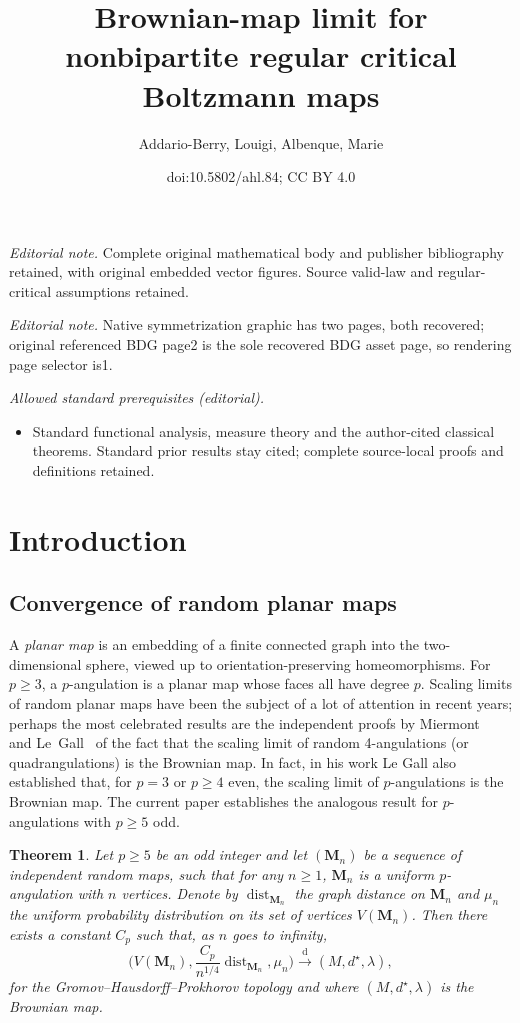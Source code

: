\documentclass[10pt]{amsart}
\title{Brownian-map limit for nonbipartite regular critical Boltzmann maps}
\author{Addario-Berry, Louigi, Albenque, Marie}
\date{doi:10.5802/ahl.84; CC BY 4.0}
\newtheorem{theo}{Theorem}[section]
\theoremstyle{definition}\newtheorem{defi}[theo]{Definition}\newtheorem{rema}[theo]{Remark}\newtheorem{exam}[theo]{Example}\newtheorem{exem}[theo]{Example}\newtheorem{nota}[theo]{Notation}
\newcommand{\bM}{\mathbf{M}}
\DeclareMathOperator{\dist}{dist}
\newcommand{\convdist}{\ensuremath{\stackrel{\mathrm{d}}{\rightarrow}}}
\begin{document}
\maketitle
\noindent\textit{Editorial note.} Complete original mathematical body and publisher bibliography retained, with original embedded vector figures. Source valid-law and regular-critical assumptions retained.\par\medskip
\noindent\textit{Editorial note.} Native symmetrization graphic has two pages, both recovered; original referenced BDG page2 is the sole recovered BDG asset page, so rendering page selector is1.\par\medskip
\noindent\textit{Allowed standard prerequisites (editorial).}\begin{itemize}
\item Standard functional analysis, measure theory and the author-cited classical theorems. Standard prior results stay cited; complete source-local proofs and definitions retained.
\end{itemize}\medskip


\section{Introduction}\label{sec:introduction}

\subsection{Convergence of random planar maps}
A \emph{planar map} is an embedding of a finite connected graph into the two-dimensional sphere, viewed up to orientation-preserving homeomorphisms. For $p\geq 3$, a \linebreak$p$-angulation is a planar map whose faces all have degree $p$. Scaling limits of random planar maps have been the subject of a lot of attention in recent years; perhaps the most celebrated results are the independent proofs by Miermont~\cite{MiermontBrownian} and Le~Gall~\cite{LeGallUniqueness} of the fact that the scaling limit of random 4-angulations (or quadrangulations) is the Brownian map. In fact, in his work Le Gall also established that, for $p=3$ or $p\ge 4$ even, the scaling limit of $p$-angulations is the Brownian map. The current paper establishes the analogous result for $p$-angulations with $p\ge 5$ odd.

\begin{theo}\label{th:oddAngulations}
Let $p\geq 5$ be an \emph{odd} integer and let $(\bM_n)$ be a sequence of independent random maps, such that for any $n\geq 1$, $\bM_n$ is a uniform $p$-angulation with $n$ vertices. Denote by $\dist_{\bM_n}$ the graph distance on $\bM_n$ and $\mu_n$ the uniform probability distribution on its set of vertices $V(\bM_n)$. Then there exists a constant $C_p$ such that, as $n$ goes to infinity,
\[
\Big(V(\bM_n),\frac{C_p}{n^{1/4}}\dist_{\bM_n},\mu_n\Big) \convdist (M,d^\star,\lambda),
\]
for the Gromov--Hausdorff--Prokhorov topology and where $(M,d^\star,\lambda)$ is the Brownian map.
\end{theo}
\end{document}
